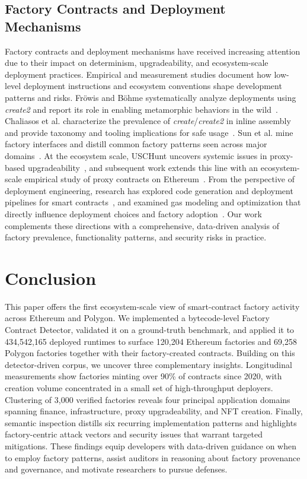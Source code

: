 \documentclass[acmsmall, screen]{acmart}
\begin{document}
	\subsection{Factory Contracts and Deployment Mechanisms}
	Factory contracts and deployment mechanisms have received increasing attention due to their
	impact on determinism, upgradeability, and ecosystem-scale deployment practices. Empirical and measurement
	studies document how low-level deployment instructions and ecosystem conventions shape development
	patterns and risks. Fröwis and Böhme systematically analyze deployments using \textit{create2} and
	report its role in enabling metamorphic behaviors in the wild~\cite{DBLP:conf/fc/FrowisB22}.
	Chaliasos et al. characterize the prevalence of \textit{create}/\textit{create2} in inline assembly
	and provide taxonomy and tooling implications for safe usage~\cite{DBLP:journals/pacmpl/ChaliasosGL22}.
	Sun et al. mine factory interfaces and distill common factory patterns seen across major domains~\cite{DBLP:conf/sigsoft/SunXLLL23}.
	At the ecosystem scale, USCHunt uncovers systemic issues in proxy-based upgradeability~\cite{DBLP:conf/uss/BodellMD23},
	and subsequent work extends this line with an ecosystem-scale empirical study of proxy contracts
	on Ethereum~\cite{proxy-empirical-ecosystem}. From the perspective of deployment engineering,
	research has explored code generation and deployment pipelines for smart contracts~\cite{DBLP:conf/wcre/TsiounisK22},
	and examined gas modeling and optimization that directly influence deployment choices and factory
	adoption~\cite{DBLP:conf/kbse/Li21a,DBLP:journals/jss/SorboLVVC22,DBLP:journals/tosem/AlbertGHRS22}.
	Our work complements these directions with a comprehensive, data-driven analysis of factory prevalence,
	functionality patterns, and security risks in practice.

	\section{Conclusion}
	\label{sec:conclusion} This paper offers the first ecosystem-scale view of smart-contract factory
	activity across Ethereum and Polygon. We implemented a bytecode-level Factory Contract Detector,
	validated it on a ground-truth benchmark, and applied it to 434{,}542{,}165 deployed runtimes to
	surface 120{,}204 Ethereum factories and 69{,}258 Polygon factories together with their factory-created
	contracts. Building on this detector-driven corpus, we uncover three complementary insights. Longitudinal
	measurements show factories minting over 90\% of contracts since 2020, with creation volume concentrated
	in a small set of high-throughput deployers. Clustering of 3,000 verified factories reveals four
	principal application domains spanning finance, infrastructure, proxy upgradeability, and NFT creation.
	Finally, semantic inspection distills six recurring implementation patterns and highlights factory-centric
	attack vectors and security issues that warrant targeted mitigations. These findings equip
	developers with data-driven guidance on when to employ factory patterns, assist auditors in reasoning
	about factory provenance and governance, and motivate researchers to pursue defenses.
\end{document}
